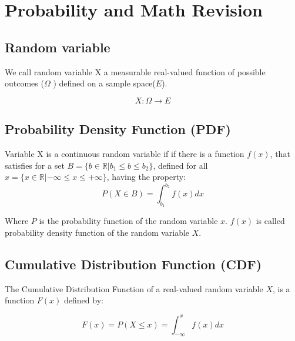 \chapter{Probability and Math Revision}
\label{ap:revision-probability}


\section{Random variable}
We call random variable X a measurable real-valued  function of possible outcomes ($\Omega$ ) defined on a sample space($E$).

\begin{equation}
	X: \Omega \rightarrow E
\end{equation}

\section{Probability Density Function (PDF)}

Variable X  is a continuous random variable if if there is a function $f (x) $, that satisfies for a set $B = \{b \in \mathbb{R} | b_ {1} \leq b \leq b_ {2}\} $, defined for all $x = \{x \in \mathbb{R}| - \infty \leq x \leq + \infty\} $, having the property: 
\begin{equation}
	P(X \in B) = \int_{b_{1}}^{b_{2}}f(x) dx 
\end{equation}

Where $P$ is the probability function of the random variable $x$. $f(x)$ is called probability density function of the random variable $X$\cite{ross-probability}. 


\section{Cumulative Distribution Function (CDF)}

The Cumulative Distribution Function of a real-valued random variable $X$, is a function $F (x) $ defined by\cite{ross-probability}: 


\begin{equation}
F(x) = P(X \leq x) = \int_{- \infty}^{x}f(x) dx 
\end{equation}

